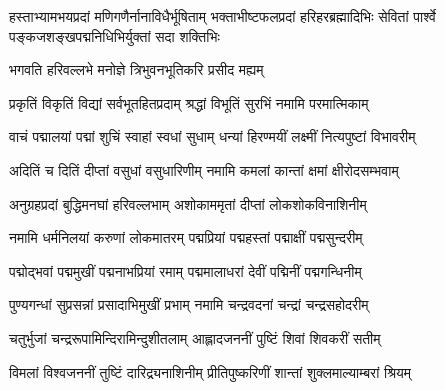 
%
%
%
%

{हस्ताभ्यामभयप्रदां मणिगणैर्नानाविधैर्भूषिताम्}
{भक्ताभीष्टफलप्रदां हरिहरब्रह्मादिभिः सेवितां}
{पार्श्वे पङ्कजशङ्खपद्मनिधिभिर्युक्तां सदा शक्तिभिः}

{भगवति हरिवल्लभे मनोज्ञे त्रिभुवनभूतिकरि प्रसीद मह्यम्}

\resetShloka
\twolineshloka
{प्रकृतिं विकृतिं विद्यां सर्वभूतहितप्रदाम्}
{श्रद्धां विभूतिं सुरभिं नमामि परमात्मिकाम्}

\twolineshloka
{वाचं पद्मालयां पद्मां शुचिं स्वाहां स्वधां सुधाम्}
{धन्यां हिरण्मयीं लक्ष्मीं नित्यपुष्टां विभावरीम्}

\twolineshloka
{अदितिं च दितिं दीप्तां वसुधां वसुधारिणीम्}
{नमामि कमलां कान्तां क्षमां क्षीरोदसम्भवाम्}

\twolineshloka
{अनुग्रहप्रदां बुद्धिमनघां हरिवल्लभाम्}
{अशोकाममृतां दीप्तां लोकशोकविनाशिनीम्}

\twolineshloka
{नमामि धर्मनिलयां करुणां लोकमातरम्}
{पद्मप्रियां पद्महस्तां पद्माक्षीं पद्मसुन्दरीम्}

\twolineshloka
{पद्मोद्भवां पद्ममुखीं पद्मनाभप्रियां रमाम्}
{पद्ममालाधरां देवीं पद्मिनीं पद्मगन्धिनीम्}

\twolineshloka
{पुण्यगन्धां सुप्रसन्नां प्रसादाभिमुखीं प्रभाम्}
{नमामि चन्द्रवदनां चन्द्रां चन्द्रसहोदरीम्}

\twolineshloka
{चतुर्भुजां चन्द्ररूपामिन्दिरामिन्दुशीतलाम्}
{आह्लादजननीं पुष्टिं शिवां शिवकरीं सतीम्}

\twolineshloka
{विमलां विश्वजननीं तुष्टिं दारिद्र्यनाशिनीम्}
{प्रीतिपुष्करिणीं शान्तां शुक्लमाल्याम्बरां श्रियम्}


